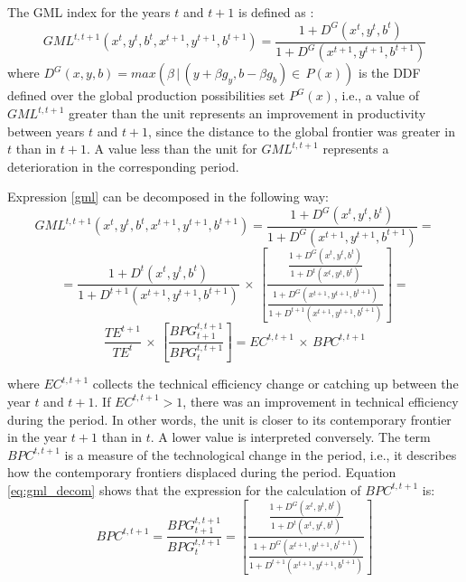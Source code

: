 \documentclass[11pt,a4paper,oneside]{article}
\begin{document}
The GML index for the years $t$ and $t+1$ is defined as \citep{Oh:2010gf}:\\
%
\begin{equation}\label{gml}
GML^{t,t+1}\left(x^{t},y^{t},b^{t},x^{t+1},y^{t+1},b^{t+1}\right)=\frac{1+D^{G}(x^{t},y^{t},b^{t})}{1+D^{G}(x^{t+1},y^{t+1},b^{t+1})}
\end{equation}
%
\noindent where $D^{G}(x,y,b)=max(\beta\,|\,(y+\beta g_{y},b-\beta g_{b})\in\, P(x ))$ is the DDF defined over the global production possibilities set $P^{G}(x)$, i.e., a value of $GML^{t,t+1}$ greater than the unit represents an improvement in productivity between years $t$ and $t+1$, since the distance to the global frontier was greater in $t$ than in $t+1$. A value less than the unit for $GML^{t,t+1}$ represents a deterioration in the corresponding period.

Expression \eqref{gml} can be decomposed in the following way:
%
\begin{equation*}
GML^{t,t+1}\left(x^{t},y^{t},b^{t},x^{t+1},y^{t+1},b^{t+1}\right)=\frac{1+D^{G}(x^{t},y^{t},b^{t})}{1+D^{G}(x^{t+1},y^{t+1},b^{t+1})}=
\end{equation*}
\begin{equation}\label{eq:gml_decom}
=	\frac{1+D^{t}(x^{t},y^{t},b^{t})}{1+D^{t+1}(x^{t+1},y^{t+1},b^{t+1})}\,\times\, \left[\frac{\frac{1+D^{G}(x^{t},y^{t},b^{t})}{1+D^{t}(x^{t},y^{t},b^{t})}}{\frac{1+D^{G}(x^{t+1},y^{t+1},b^{t+1})}{1+D^{t+1}(x^{t+1},y^{t+1},b^{t+1})}}\right]=
\end{equation}
\begin{equation*}
\frac{TE^{t+1}}{TE^{t}}\,\times\,\left[\frac{BPG_{t+1}^{t,t+1}}{BPG_{t}^{t,t+1}}\right]=
EC^{t,t+1}\,\times\,BPC^{t,t+1}
\end{equation*}

\noindent where $EC^{t,t+1}$ collects the technical efficiency change or 
catching up between the year $t$ and $t+1$. If $EC^{t,t+1}>1$, there was an improvement in technical efficiency during the period. In other words, 
the unit is closer to its contemporary frontier in the year $t+1$ than in $t$. A lower value is interpreted conversely. The term $BPC^{t,t+1}$ is a measure 
of the technological change in the period, i.e., it describes how the 
contemporary frontiers displaced during the period. Equation \eqref{eq:gml_decom} shows that the expression for the calculation of $BPC^{t,t+1}$ is:
% 
\begin{equation}
BPC^{t,t+1}=\frac{BPG_{t+1}^{t,t+1}}{BPG_{t}^{t,t+1}}=\left[\frac{\frac{1+D^{G}(x^{t},y^{t},b^{t})}{1+D^{t}(x^{t},y^{t},b^{t})}}{\frac{1+D^{G}(x^{t+1},y^{t+1},b^{t+1})}{1+D^{t+1}(x^{t+1},y^{t+1},b^{t+1})}}\right]
\end{equation}
\end{document}
